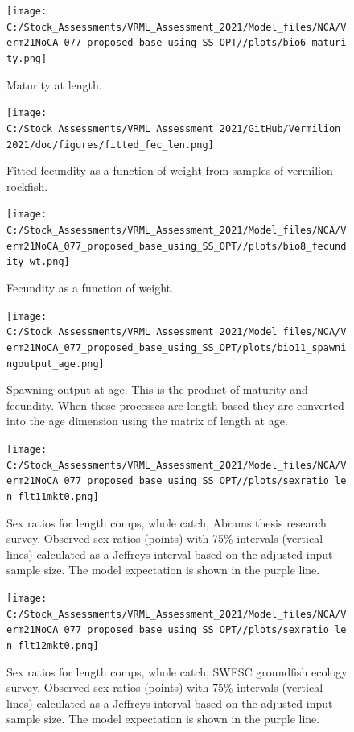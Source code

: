 \documentclass[
  english,
  a4paper,
]{article}
\begin{document}
\begin{figure}
\centering
\texttt{[image: C:/Stock\_Assessments/VRML\_Assessment\_2021/Model\_files/NCA/Verm21NoCA\_077\_proposed\_base\_using\_SS\_OPT//plots/bio6\_maturity.png]}
\caption{Maturity at length.\label{fig:maturity}}
\end{figure}

\begin{figure}
\centering
\texttt{[image: C:/Stock\_Assessments/VRML\_Assessment\_2021/GitHub/Vermilion\_2021/doc/figures/fitted\_fec\_len.png]}
\caption{Fitted fecundity as a function of weight from samples of vermilion rockfish.\label{fig:fitted-fecundity}}
\end{figure}

\begin{figure}
\centering
\texttt{[image: C:/Stock\_Assessments/VRML\_Assessment\_2021/Model\_files/NCA/Verm21NoCA\_077\_proposed\_base\_using\_SS\_OPT//plots/bio8\_fecundity\_wt.png]}
\caption{Fecundity as a function of weight.\label{fig:fecundity}}
\end{figure}

\begin{figure}
\centering
\texttt{[image: C:/Stock\_Assessments/VRML\_Assessment\_2021/Model\_files/NCA/Verm21NoCA\_077\_proposed\_base\_using\_SS\_OPT/plots/bio11\_spawningoutput\_age.png]}
\caption{Spawning output at age. This is the product of maturity and fecundity. When these processes are length-based they are converted into the age dimension using the matrix of length at age.\label{fig:spawnage}}
\end{figure}

\FloatBarrier

\begin{figure}
\centering
\texttt{[image: C:/Stock\_Assessments/VRML\_Assessment\_2021/Model\_files/NCA/Verm21NoCA\_077\_proposed\_base\_using\_SS\_OPT//plots/sexratio\_len\_flt11mkt0.png]}
\caption{Sex ratios for length comps, whole catch, Abrams thesis research survey. Observed sex ratios (points) with 75\% intervals (vertical lines) calculated as a Jeffreys interval based on the adjusted input sample size. The model expectation is shown in the purple line.\label{fig:sexratio-ABRAMS-RESEARCH}}
\end{figure}

\begin{figure}
\centering
\texttt{[image: C:/Stock\_Assessments/VRML\_Assessment\_2021/Model\_files/NCA/Verm21NoCA\_077\_proposed\_base\_using\_SS\_OPT//plots/sexratio\_len\_flt12mkt0.png]}
\caption{Sex ratios for length comps, whole catch, SWFSC groundfish ecology survey. Observed sex ratios (points) with 75\% intervals (vertical lines) calculated as a Jeffreys interval based on the adjusted input sample size. The model expectation is shown in the purple line.\label{fig:sexratio-SWFSC-GF-ECOL}}
\end{figure}
\end{document}
